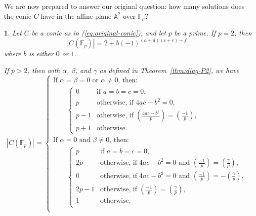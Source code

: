 \documentclass[10pt,a4paper]{amsart}
\numberwithin{equation}{section}
\numberwithin{figure}{section}
\theoremstyle{definition}
\theoremstyle{plain}
\newtheorem{thm}{\protect\theoremname}[section]
\theoremstyle{remark}
\theoremstyle{plain}
\theoremstyle{definition}
\theoremstyle{plain}
\theoremstyle{plain}
\providecommand{\theoremname}{Theorem}
\newcommand{\legendre}[2]{\genfrac{(}{)}{}{}{#1}{#2}}
\newcommand{\A}{\mathbb{A}}
\newcommand{\F}{\mathbb{F}}
\begin{document}
	We are now prepared to answer our original question: how many solutions does the conic $C$ have in the affine plane $\A^2$ over $\F_p$? 
	
    \begin{thm}
	Let $C$ be a conic as in (\ref{eq:original-conic}), and let $p$ be a prime. If $p=2$, then
	\begin{equation*}
	|C(\F_p)|=2 + b(-1)^{(a+d)(c+e) + f},
	\end{equation*}
	where $b$ is either $0$ or $1$.
	
	If $p > 2$, then with $\alpha$, $\beta$, and $\gamma$ as defined in Theorem~\ref{thm:diag-P2}, we have
	\begin{equation*}
	|C(\F_p)|=\begin{cases}
	\textrm{If }\alpha=\beta=0\textrm{ or }\alpha\ne 0\textrm{, then:}\\
\qquad\begin{cases}
	0&\textrm{if }a=b=c=0,\\
	p&\textrm{otherwise, if }4ac-b^2=0,\\
	p-1&\textrm{otherwise, if }\legendre{4ac-b^2}{p}=\legendre{-1}{p},\\
	p+1&\textrm{otherwise.}
	\end{cases}\\
	\textrm{If }\alpha=0\textrm{ and }\beta\ne 0\textrm{, then:}\\
\qquad\begin{cases}
	p&\textrm{if }a=b=c=0,\\
	2p&\textrm{otherwise, if }4ac-b^2=0\textrm{ and }\legendre{-1}{p}=\legendre{\gamma}{p},\\
	0&\textrm{otherwise, if }4ac-b^2=0\textrm{ and }\legendre{-1}{p}=-\legendre{\gamma}{p},\\
	2p-1&\textrm{otherwise, if }\legendre{-1}{p}=\legendre{\gamma}{p},\\
	1&\textrm{otherwise.}\\
	\end{cases}\\
	\end{cases}
	\end{equation*}
	
	\end{thm}
\end{document}
